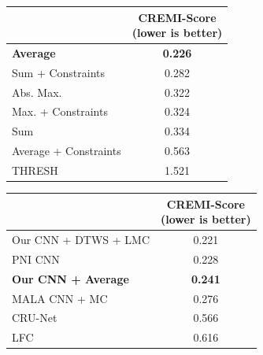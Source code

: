 \begin{figure}[t]
        \centering
\begin{minipage}[t]{0.31\textwidth}
    \centering
    \scriptsize
        \begin{tabular}[t]{l|c}
          & \makecell{CREMI-Score \\(lower is better)} \\ \midrule 
\textbf{\algname{}} \textbf{Average}& \textbf{0.226}  \\
\algname{} Sum + Constraints \cite{levinkov2017comparative} & 0.282 \\
\algname{} Abs. Max. \cite{wolf2018mutex} & 0.322 \\
\algname{} Max. + Constraints & 0.324 \\
\algname{} Sum \cite{keuper2015efficient} & 0.334 \\
\algname{} Average + Constraints & 0.563 \\
THRESH & 1.521 \\ 
        \end{tabular}
    \label{tab:results_cremi_train}
\end{minipage}\hfill
\begin{minipage}[t]{0.3\textwidth}
    \centering
    \scriptsize
        \begin{tabular}[t]{l|c}
         & \makecell{CREMI-Score \\(lower is better)}  \\ \midrule
Our CNN + DTWS + LMC &  0.221\\
PNI CNN \cite{lee2017superhuman} & 0.228 \\
\textbf{Our CNN + \algname{} Average} & \textbf{0.241} \\
MALA CNN + MC \cite{funke2018large} & 0.276 \\
CRU-Net \cite{zeng2017deepem3d} & 0.566  \\
LFC \cite{parag2017anisotropic} & 0.616  \\
        \end{tabular}
        \vspace*{4.5em}
    \label{tab:results_cremi_test}
\end{minipage}\hfill

\end{figure}
